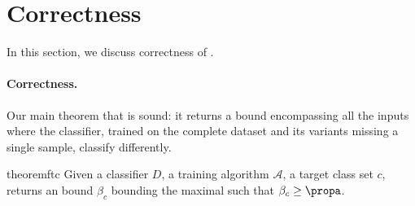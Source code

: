 \section{Correctness}
\label{sec:correctness}
In this section, we discuss correctness of \tool. 

\paragraph{Correctness.} Our main theorem that \tool is sound: 
it returns a bound encompassing all the inputs where the classifier, trained on the complete dataset and its variants missing a single sample, classify differently.


\begin{restatable}[]{theorem}{ftc}
\label{thm1}
Given a classifier $D$, a training algorithm $\mathcal{A}$, a target class set $c$,  
\tool returns an bound $\beta_c$
bounding the maximal \propa such that $\beta_c\geq \text{\propa}$. 
\end{restatable}